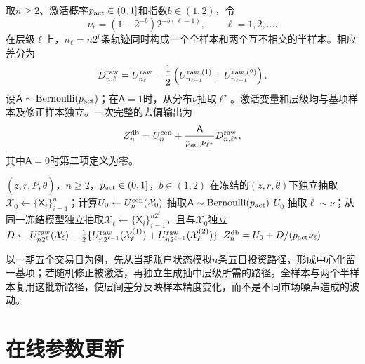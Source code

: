 取$n\ge2$、激活概率$p_{\rm act}\in(0,1]$和指数$b\in(1,2)$，令
\begin{equation}\label{eq:level-probabilities}
 \nu_\ell=(1-2^{-b})2^{-b(\ell-1)},
 \qquad \ell=1,2,\ldots.
\end{equation}
在层级$\ell$上，$n_\ell=n2^\ell$条轨迹同时构成一个全样本和两个互不相交的半样本。相应差分为
\begin{equation}\label{eq:raw-level-difference}
 D_{n,\ell}^{\rm raw}
 =U_{n_\ell}^{\rm raw}
 -\frac12\left(
 U_{n_{\ell-1}}^{\rm raw,(1)}
 +U_{n_{\ell-1}}^{\rm raw,(2)}
 \right).
\end{equation}
设$\mathsf A\sim\operatorname{Bernoulli}(p_{\rm act})$；在$\mathsf A=1$时，从分布$\nu$抽取$\ell^\star$。激活变量和层级均与基项样本及修正样本独立。一次完整的去偏输出为
\begin{equation}\label{eq:debiased-output}
 Z_n^{\mathrm{db}}
 =U_n^{\rm cen}
 +\frac{\mathsf A}{p_{\rm act}\nu_{\ell^\star}}D_{n,\ell^\star}^{\rm raw},
\end{equation}
其中$\mathsf A=0$时第二项定义为零。

\begin{algorithm}[H]
\caption{一次中心化留一随机层去偏CPT梯度输出}\label{alg:cloo-rd}
\begin{minipage}{0.88\linewidth}
\begin{algorithmic}[1]
\REQUIRE $(z,r,\widetilde P,\theta)$，$n\ge2$，$p_{\rm act}\in(0,1]$，$b\in(1,2)$
\STATE 在冻结的$(z,r,\theta)$下独立抽取$\mathcal X_0\gets\{\mathsf X_i\}_{i=1}^{n}$；计算$U_0\gets U_n^{\rm cen}(\mathcal X_0)$
\STATE 抽取$\mathsf A\sim\operatorname{Bernoulli}(p_{\rm act})$
    \RETURN $U_0$
\ENDIF
\STATE 抽取$\ell\sim\nu$；从同一冻结模型独立抽取$\mathcal X_\ell\gets\{\mathsf X_i\}_{i=1}^{n2^\ell}$，且与$\mathcal X_0$独立
\STATE $D\gets U_{n2^\ell}^{\rm raw}(\mathcal X_\ell)-\tfrac12\{U_{n2^{\ell-1}}^{\rm raw}(\mathcal X_\ell^{(1)})+U_{n2^{\ell-1}}^{\rm raw}(\mathcal X_\ell^{(2)})\}$
\RETURN $Z_n^{\mathrm{db}}=U_0+D/(p_{\rm act}\nu_\ell)$
\end{algorithmic}
\end{minipage}
\end{algorithm}

以一期五个交易日为例，先从当期账户状态模拟$n$条五日投资路径，形成中心化留一基项；若随机修正被激活，再独立生成抽中层级所需的路径。全样本与两个半样本复用这批新路径，使层间差分反映样本精度变化，而不是不同市场噪声造成的波动。

\section{在线参数更新}

